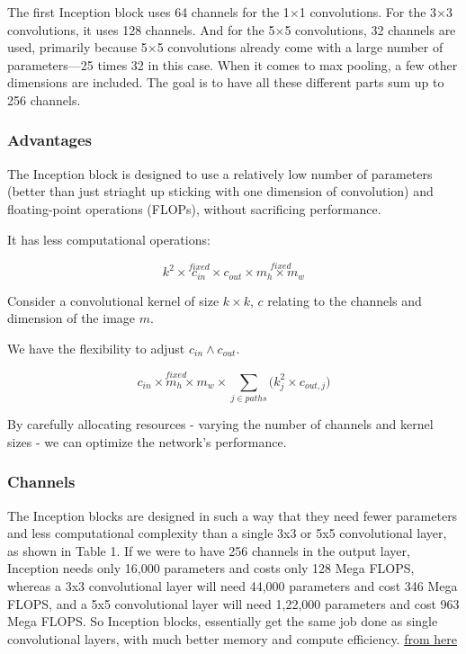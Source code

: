 \documentclass[11pt]{article}
\begin{document}
The first Inception block uses 64 channels for the 1$\times$1 convolutions. For the 3$\times$3 convolutions, it uses 128 channels. And for the 5$\times$5 convolutions, 32 channels are used, primarily because 5$\times$5 convolutions already come with a large number of parameters—25 times 32 in this case. When it comes to max pooling, a few other dimensions are included. The goal is to have all these different parts sum up to 256 channels. 

\subsubsection{Advantages}

The Inception block is designed to use a relatively low number of parameters (better than just striaght up sticking with one dimension of convolution) and floating-point operations (FLOPs), without sacrificing performance.

It has less computational operations:

\begin{equation*}
    k^2 \times \stackrel{fixed}{\boxed{c_{in}}} \times c_{out} \times \stackrel{fixed}{\boxed{m_h \times m_w}}
\end{equation*}

Consider a convolutional kernel of size $k\times k$, $c$ relating to the channels and dimension of the image $m$. 

We have the flexibility to adjust $c_{in} \wedge c_{out}$.

\begin{equation*}
    \stackrel{fixed}{\boxed{c_{in} \times m_h \times m_w}} \times \sum_{j \in paths}\bigl(k^2_j \times c_{out,j}\bigr)
\end{equation*}

By carefully allocating resources - varying the number of channels and kernel sizes - we can optimize the network's performance.

\subsubsection{Channels}

The Inception blocks are designed in such a way that they need fewer parameters and less computational complexity than a single 3x3 or 5x5 convolutional layer, as shown in Table 1. If we were to have 256 channels in the output layer, Inception needs only 16,000 parameters and costs only 128 Mega FLOPS, whereas a 3x3 convolutional layer will need 44,000 parameters and cost 346 Mega FLOPS, and a 5x5 convolutional layer will need 1,22,000 parameters and cost 963 Mega FLOPS. So Inception blocks, essentially get the same job done as single convolutional layers, with much better memory and compute efficiency. \href{https://medium.com/swlh/understanding-inception-simplifying-the-network-architecture-54cd31d38949}{from here}
\end{document}
